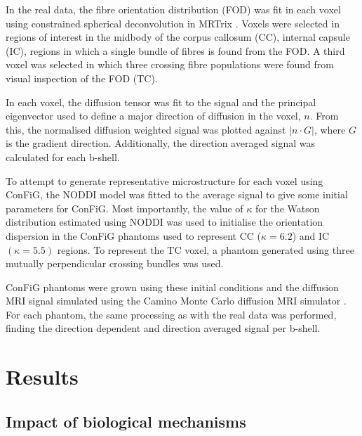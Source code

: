 In the real data, the fibre orientation distribution (FOD) was fit in each voxel using constrained spherical deconvolution in MRTrix \cite{Tournier2019,Tournier2007}. Voxels were selected in regions of interest in the midbody of the corpus callosum (CC), internal capsule (IC), regions in which a single bundle of fibres is found from the FOD. A third voxel was selected in which three crossing fibre populations were found from visual inspection of the FOD (TC).

In each voxel, the diffusion tensor was fit to the signal and the principal eigenvector used to define a major direction of diffusion in the voxel, $n$. From this, the normalised diffusion weighted signal was plotted against $|n\cdot G|$, where $G$ is the gradient direction. Additionally, the direction averaged signal was calculated for each b-shell.

To attempt to generate representative microstructure for each voxel using ConFiG, the NODDI model \cite{Zhang2012} was fitted to the average signal to give some initial parameters for ConFiG. Most importantly, the value of $\kappa$ for the Watson distribution \cite{Mardia2008} estimated using NODDI was used to initialise the orientation dispersion in the ConFiG phantoms used to represent CC ($\kappa=6.2$) and IC $(\kappa=5.5)$ regions. To represent the TC voxel, a phantom generated using three mutually perpendicular crossing bundles was used.

ConFiG phantoms were grown using these initial conditions and the diffusion MRI signal simulated using the Camino Monte Carlo diffusion MRI simulator \cite{Hall2009}. For each phantom, the same processing as with the real data was performed, finding the direction dependent and direction averaged signal per b-shell.

\section{Results}
\label{sec:config_results}

\subsection{Impact of biological mechanisms}
\label{sec:config_result_impact_of_mechanisms}

